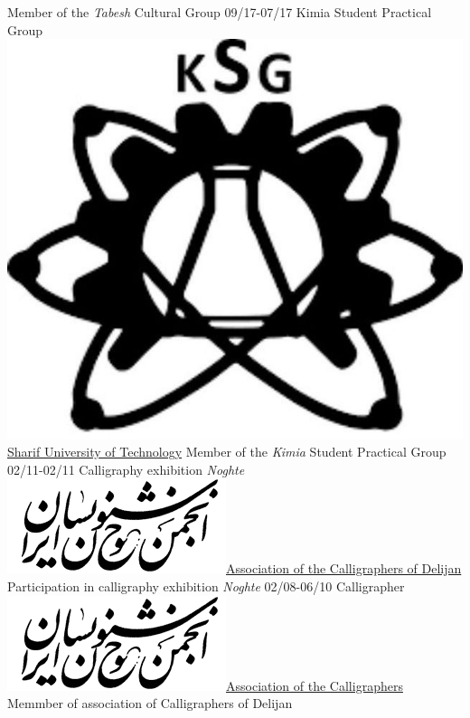 \documentclass[a4paper]{friggeri-cv}
\begin{document}
\begin{entrylist}
     {Member of the \emph{Tabesh} Cultural Group}
    \entry
    {09/17-07/17}
    {   Kimia Student Practical Group}
    {\href{http://www.sharif.ir}{\includegraphics[scale=0.03]{img/Kimia_logo.jpg} Sharif University of Technology}}
    {Member of the \emph{Kimia} Student Practical Group}
    \entry
    {02/11-02/11}
    {    Calligraphy exhibition \emph{Noghte}}
    {\href{http://calligraphers.ir/}{\includegraphics[scale=0.15]{img/Khoshnevisan_logo.png}Association of the Calligraphers of Delijan}}
    {Participation in calligraphy exhibition \emph{Noghte}}
    \entry
    {02/08-06/10}
    {   Calligrapher}
    {\href{http://calligraphers.ir/}{\includegraphics[scale=0.15]{img/Khoshnevisan_logo.png}Association of the Calligraphers}}
    {Memmber of association of Calligraphers of Delijan}
\end{entrylist}
\\
\end{document}
